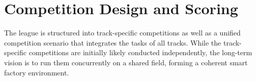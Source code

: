 \documentclass[letterpaper, 11pt]{extarticle}
\begin{document}






\section{Competition Design and Scoring}
\label{s: competition_design}
The league is structured into track-specific competitions as well as a unified competition scenario that integrates the tasks of all tracks. While the track-specific competitions are initially likely conducted independently, the long-term vision is to run them concurrently on a shared field, forming a coherent smart factory environment.
\end{document}
